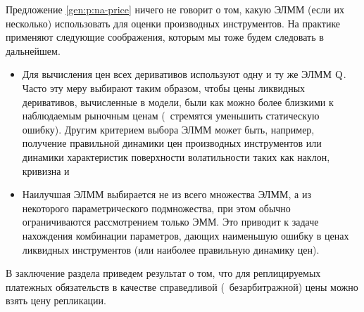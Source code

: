 Предложение \ref{gen:p:na-price} ничего не говорит о том, какую ЭЛММ (если их несколько) использовать для оценки производных инструментов.
На практике применяют следующие соображения, которым мы тоже будем следовать в дальнейшем.
\begin{itemize}
\item Для вычисления цен всех деривативов используют одну и ту же ЭЛММ $\mathrm{Q}$.
Часто эту меру выбирают таким образом, чтобы цены ликвидных деривативов, вычисленные в модели, были как можно более близкими к наблюдаемым рыночным ценам (\te\ стремятся уменьшить статическую ошибку).
Другим критерием выбора ЭЛММ может быть, например, получение правильной динамики цен производных инструментов или динамики характеристик поверхности волатильности таких как наклон, кривизна и \tp

\item Наилучшая ЭЛММ выбирается не из всего множества ЭЛММ, а из некоторого параметрического подмножества, при этом обычно  ограничиваются рассмотрением только ЭММ.
Это приводит к задаче нахождения комбинации параметров, дающих наименьшую ошибку в ценах ликвидных инструментов (или наиболее правильную динамику цен).
\end{itemize}

\medskip
В заключение раздела приведем результат о том, что для реплицируемых платежных обязательств в качестве справедливой (\te\ безарбитражной) цены можно взять цену репликации.

